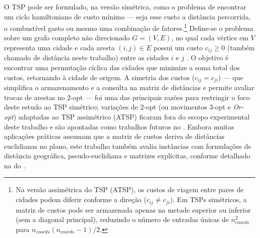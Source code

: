 O TSP pode ser formulado, na versão simétrica, como o problema de encontrar um ciclo hamiltoniano de custo mínimo --- seja esse custo a distância percorrida, o combustível gasto ou mesmo uma combinação de fatores.\footnote{Na versão assimétrica do TSP (ATSP), os custos de viagem entre pares de cidades podem diferir conforme a direção (\(c_{ij} \neq c_{ji}\)). Em TSPs simétricos, a matriz de custos pode ser armazenada apenas na metade superior ou inferior (sem a diagonal principal), reduzindo o número de entradas únicas de \(n_{coords}^2\) para \(n_{coords}(n_{coords}-1)/2\).}
Define-se o problema sobre um grafo completo não direcionado \(G = (V, E)\), no qual cada vértice em \(V\) representa uma cidade e cada aresta \((i, j) \in E\) possui um custo \(c_{ij} \geq 0\) (também chamado de distância neste trabalho) entre as cidades \(i\) e \(j\) \autocite{cook2012pursuit}.
O objetivo é encontrar uma permutação cíclica das cidades que minimize a soma total dos custos, retornando à cidade de origem.
A simetria dos custos (\(c_{ij} = c_{ji}\)) --- que simplifica o armazenamento e a consulta na matriz de distâncias e permite avaliar trocas de arestas no \(2\)-opt --- foi uma das principais razões para restringir o foco deste estudo ao TSP simétrico; variações de \(2\)-opt (ou movimentos \(3\)-opt e \emph{Or-opt}) adaptadas ao TSP assimétrico (ATSP) ficaram fora do escopo experimental deste trabalho e são apontadas como trabalhos futuros no .
Embora muitas aplicações práticas assumam que a matriz de custos deriva de distâncias euclidianas no plano, este trabalho também avalia instâncias com formulações de distância geográfica, pseudo-euclidiana e matrizes explícitas, conforme detalhado na  do .

